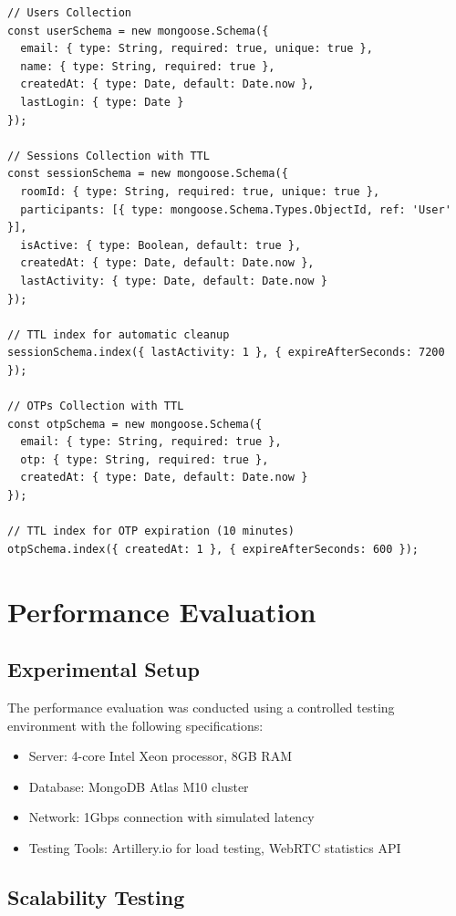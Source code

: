 \documentclass[conference]{IEEEtran}
\begin{document}
\begin{lstlisting}[caption=Database Schema and Indexes, label=lst:schema]
// Users Collection
const userSchema = new mongoose.Schema({
  email: { type: String, required: true, unique: true },
  name: { type: String, required: true },
  createdAt: { type: Date, default: Date.now },
  lastLogin: { type: Date }
});

// Sessions Collection with TTL
const sessionSchema = new mongoose.Schema({
  roomId: { type: String, required: true, unique: true },
  participants: [{ type: mongoose.Schema.Types.ObjectId, ref: 'User' }],
  isActive: { type: Boolean, default: true },
  createdAt: { type: Date, default: Date.now },
  lastActivity: { type: Date, default: Date.now }
});

// TTL index for automatic cleanup
sessionSchema.index({ lastActivity: 1 }, { expireAfterSeconds: 7200 });

// OTPs Collection with TTL
const otpSchema = new mongoose.Schema({
  email: { type: String, required: true },
  otp: { type: String, required: true },
  createdAt: { type: Date, default: Date.now }
});

// TTL index for OTP expiration (10 minutes)
otpSchema.index({ createdAt: 1 }, { expireAfterSeconds: 600 });
\end{lstlisting}

\section{Performance Evaluation}

\subsection{Experimental Setup}

The performance evaluation was conducted using a controlled testing environment with the following specifications:
\begin{itemize}
\item Server: 4-core Intel Xeon processor, 8GB RAM
\item Database: MongoDB Atlas M10 cluster
\item Network: 1Gbps connection with simulated latency
\item Testing Tools: Artillery.io for load testing, WebRTC statistics API
\end{itemize}

\subsection{Scalability Testing}
\end{document}
